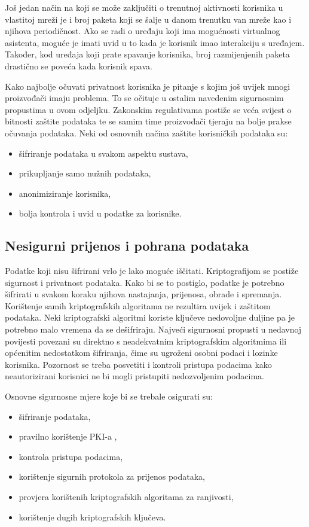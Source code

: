 \documentclass[times, utf8, diplomski]{fer}
\begin{document}
Još jedan način na koji se može zaključiti o trenutnoj aktivnosti korisnika u vlastitoj mreži je i broj paketa koji se šalje u danom trenutku van mreže kao i njihova periodičnost. Ako se radi o uređaju koji ima mogućnosti virtualnog asistenta, moguće je imati uvid u to kada je korisnik imao interakciju s uređajem. Također, kod uređaja koji prate spavanje korisnika, broj razmijenjenih paketa drastično se poveća kada korisnik spava\citep{Apthorpe2017May}.

Kako najbolje očuvati privatnost korisnika je pitanje s kojim još uvijek mnogi proizvođači imaju problema. To se očituje u ostalim navedenim sigurnosnim propustima u ovom odjeljku. Zakonskim regulativama postiže se veća svijest o bitnosti zaštite podataka te se samim time proizvođači tjeraju na bolje prakse očuvanja podataka. Neki od osnovnih načina zaštite korisničkih podataka su: 
\begin{itemize}
    \item šifriranje podataka u svakom aspektu sustava,
    \item prikupljanje samo nužnih podataka,
    \item anonimiziranje korisnika,
    \item bolja kontrola i uvid u podatke za korisnike.
\end{itemize}

\subsection{Nesigurni prijenos i pohrana podataka}
Podatke koji nisu šifrirani vrlo je lako moguće iščitati. Kriptografijom se postiže sigurnost i privatnost podataka. Kako bi se to postiglo, podatke je potrebno šifrirati u svakom koraku njihova nastajanja, prijenosa, obrade i spremanja. Korištenje samih kriptografskih algoritama ne rezultira uvijek i zaštitom podataka. Neki kriptografski algoritmi koriste ključeve nedovoljne duljine pa je potrebno malo vremena da se dešifriraju. Najveći sigurnosni propusti u nedavnoj povijesti povezani su direktno s neadekvatnim kriptografskim algoritmima ili općenitim nedostatkom šifriranja, čime su ugroženi osobni podaci i lozinke korisnika\citep{DataBreaches}. Pozornost se treba posvetiti i kontroli pristupa podacima kako neautorizirani korisnici ne bi mogli pristupiti nedozvoljenim podacima. 

Osnovne sigurnosne mjere koje bi se trebale osigurati su: \begin{itemize}
    \item šifriranje podataka,
    \item pravilno korištenje PKI-a ,
    \item kontrola pristupa podacima,
    \item korištenje sigurnih protokola za prijenos podataka,
    \item provjera korištenih kriptografskih algoritama za ranjivosti,
    \item korištenje dugih kriptografskih ključeva.
\end{itemize}     
\end{document}
